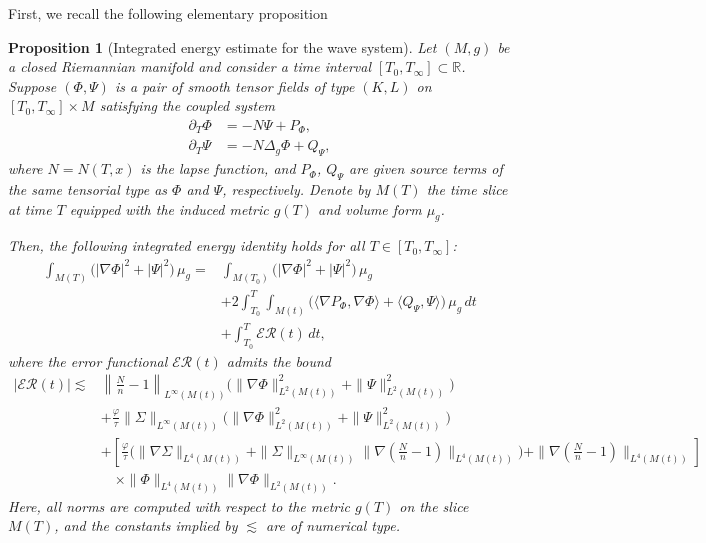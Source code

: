 \documentclass{amsart}
\newtheorem{proposition}{Proposition}[section]
\begin{document}
\noindent First, we recall the following elementary proposition 
\begin{proposition}[Integrated energy estimate for the wave system]
\label{wave}
Let $(M,g)$ be a closed Riemannian manifold and consider a time interval $[T_0,T_{\infty}] \subset \mathbb{R}$. Suppose $(\Phi,\Psi)$ is a pair of smooth tensor fields of type $(K,L)$ on $[T_0,T_{\infty}]\times M$ satisfying the coupled system
\begin{align}
\partial_T \Phi &= -N \Psi + P_{\Phi}, \\
\partial_T \Psi &= -N \Delta_g \Phi + Q_{\Psi},
\end{align}
where $N = N(T,x)$ is the lapse function, and $P_{\Phi}$, $Q_{\Psi}$ are given source terms of the same tensorial type as $\Phi$ and $\Psi$, respectively. Denote by $M(T)$ the time slice at time $T$ equipped with the induced metric $g(T)$ and volume form $\mu_g$.

\noindent Then, the following integrated energy identity holds for all $T \in [T_0,T_{\infty}]$:
\begin{align}
\int_{M(T)} \big( |\nabla \Phi|^2 + |\Psi|^2 \big) \,\mu_g
= &\int_{M(T_0)} \big( |\nabla \Phi|^2 + |\Psi|^2 \big) \,\mu_g \\
&+ 2 \int_{T_0}^T \int_{M(t)} \big( \langle \nabla P_{\Phi}, \nabla \Phi \rangle + \langle Q_{\Psi}, \Psi \rangle \big) \,\mu_g\, dt \nonumber \\
&+ \int_{T_0}^T \mathscr{E}\mathscr{R}(t)\, dt, \nonumber
\end{align}
where the error functional $\mathscr{E}\mathscr{R}(t)$ admits the bound
\begin{align}
|\mathscr{E}\mathscr{R}(t)| \lesssim &\left\| \frac{N}{n} - 1 \right\|_{L^\infty(M(t))} \big( \|\nabla \Phi\|_{L^2(M(t))}^2 + \|\Psi\|_{L^2(M(t))}^2 \big) \\
&+ \frac{\varphi}{\tau} \|\Sigma\|_{L^\infty(M(t))} \big( \|\nabla \Phi\|_{L^2(M(t))}^2 + \|\Psi\|_{L^2(M(t))}^2 \big) \nonumber \\
&+ \left[ \frac{\varphi}{\tau} \big( \|\nabla \Sigma\|_{L^4(M(t))} + \|\Sigma\|_{L^\infty(M(t))} \|\nabla (\frac{N}{n} - 1)\|_{L^4(M(t))} \big) + \|\nabla(\frac{N}{n} - 1)\|_{L^4(M(t))} \right] \nonumber \\
&\quad \times \|\Phi\|_{L^4(M(t))} \|\nabla \Phi\|_{L^2(M(t))}. \nonumber
\end{align}
Here, all norms are computed with respect to the metric $g(T)$ on the slice $M(T)$, and the constants implied by $\lesssim$ are of numerical type.

\end{proposition}
\end{document}
